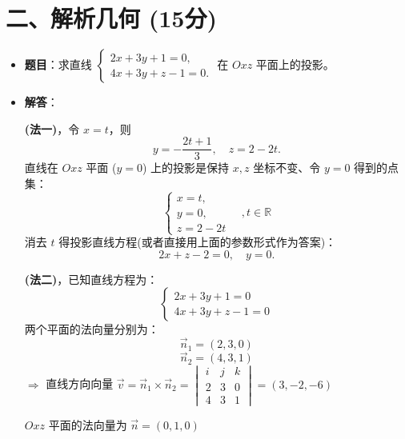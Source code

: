 \documentclass[12pt,a4paper]{article}
\begin{document}
\section*{二、解析几何 (15分)}

\begin{itemize}
    \item \textbf{题目}：求直线 
    $\begin{cases} 
    2x + 3y + 1 = 0, \\ 
    4x + 3y + z - 1 = 0. 
    \end{cases}$ 
    在 $Oxz$ 平面上的投影。

    \item \textbf{解答}：
    
    \textbf{(法一)}，令 $x=t$，则
    $$ y = -\frac{2t+1}{3}, \quad z = 2 - 2t. $$
    直线在 $Oxz$ 平面 ($y=0$) 上的投影是保持 $x,z$ 坐标不变、令 $y=0$ 得到的点集：
    $$ \begin{cases} 
    x = t, \\ 
    y = 0, \\ 
    z = 2 - 2t 
    \end{cases} \quad , t \in \mathbb{R} $$
    消去 $t$ 得投影直线方程(或者直接用上面的参数形式作为答案)：
    $$ 2x + z - 2 = 0, \quad y = 0. $$

    \textbf{(法二)}，已知直线方程为：
    $$ \begin{cases} 
    2x + 3y + 1 = 0 \\ 
    4x + 3y + z - 1 = 0 
    \end{cases} $$
    两个平面的法向量分别为：
    $$ \vec{n}_1 = (2, 3, 0) $$
    $$ \vec{n}_2 = (4, 3, 1) $$
    $\Rightarrow$ 直线方向向量 $\vec{v} = \vec{n}_1 \times \vec{n}_2 = \begin{vmatrix} i & j & k \\ 2 & 3 & 0 \\ 4 & 3 & 1 \end{vmatrix} = (3, -2, -6)$

    $Oxz$ 平面的法向量为 $\vec{n} = (0, 1, 0)$


\end{itemize}
\end{document}
